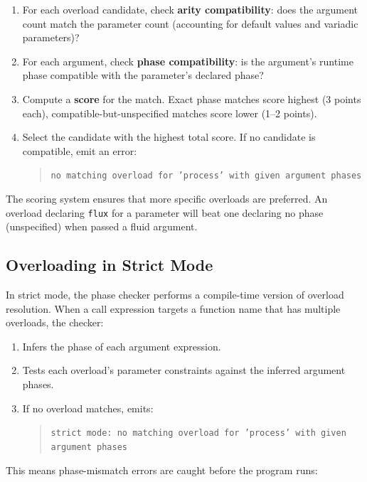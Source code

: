 \begin{enumerate}
  \item For each overload candidate, check \textbf{arity compatibility}: does the argument count match the parameter count (accounting for default values and variadic parameters)?

  \item For each argument, check \textbf{phase compatibility}: is the argument's runtime phase compatible with the parameter's declared phase?

  \item Compute a \textbf{score} for the match. Exact phase matches score highest (3 points each), compatible-but-unspecified matches score lower (1--2 points).

  \item Select the candidate with the highest total score. If no candidate is compatible, emit an error:
  \begin{quote}\small
    \texttt{no matching overload for 'process' with given argument phases}
  \end{quote}
\end{enumerate}

The scoring system ensures that more specific overloads are preferred.
An overload declaring \lstinline|flux| for a parameter will beat one declaring no phase (unspecified) when passed a fluid argument.

\subsection{Overloading in Strict Mode}

In strict mode, the phase checker performs a compile-time version of overload resolution.
When a call expression targets a function name that has multiple overloads, the checker:

\begin{enumerate}
  \item Infers the phase of each argument expression.
  \item Tests each overload's parameter constraints against the inferred argument phases.
  \item If no overload matches, emits:
  \begin{quote}\small
    \texttt{strict mode: no matching overload for 'process' with given argument phases}
  \end{quote}
\end{enumerate}

This means phase-mismatch errors are caught before the program runs:

